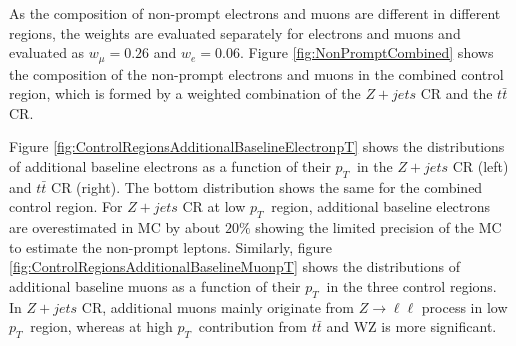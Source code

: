 As the composition of non-prompt electrons and muons are different in different regions, the weights are evaluated separately for electrons and muons and evaluated as $w_{\mu} = 0.26$ and $w_{e} = 0.06$. Figure \ref{fig:NonPromptCombined} shows the composition of the non-prompt electrons and muons in the combined control region, which is formed by a weighted combination of the $Z+jets$ CR and the $t\bar{t}$ CR.

Figure \ref{fig:ControlRegionsAdditionalBaselineElectronpT} shows the distributions of additional baseline electrons as a function of their $p_{T}~$ in the $Z+jets$ CR (left) and $t\bar{t}$ CR (right). The bottom distribution shows the same for the combined control region. For $Z+jets$ CR at low $p_{T}~$ region, additional baseline electrons are overestimated in MC by about $20\%$ showing the limited precision of the MC to estimate the non-prompt leptons. Similarly, figure \ref{fig:ControlRegionsAdditionalBaselineMuonpT} shows the distributions of additional baseline muons as a function of their $p_{T}~$ in the three control regions. In $Z+jets$ CR, additional muons mainly originate from $Z\rightarrow \ell \ell$ process in low $p_{T}~$ region, whereas at high $p_{T}~$ contribution from $t\bar{t}$ and WZ is more significant.

